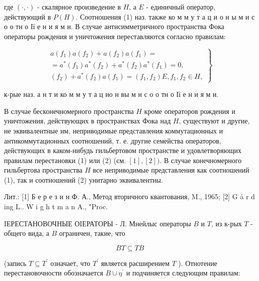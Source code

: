 \documentclass[10pt]{article}
\begin{document}
где $(\cdot, \cdot)$ - скалярное произведение в $H$, а $E$ - единичный оператор, действующий в $P(H)$. Соотношения (1) наз. также ко м м у т а ц и о н ы м и с о о тн о Ії е н и я м и. В случае антисимметричного пространства Фока операторы рождения и уничтожения переставляются согласно правилам:



\[

\left.\begin{array}{c}

a\left(f_{1}\right) a\left(f_{2}\right)+a\left(f_{2}\right) a\left(f_{1}\right)= \\

=a^{*}\left(f_{1}\right) a^{*}\left(f_{2}\right)+a^{*}\left(f_{2}\right) a^{*}\left(f_{1}\right)=0, \\

\left(f_{2}\right)+a^{*}\left(f_{2}\right) a\left(f_{1}\right)=\left(f_{1}, f_{2}\right) E, f_{1}, f_{2} \in H,

\end{array}\right\}

\]



к-рые наз. а н т и ко м м у т а ц ио н вы м и с о о тн о Ії е н и я м и.



В случае бесконечномерного пространства $H$ кроме операторов рождения и уничтожения, действующих в пространствах Фока над $H$, существуют и другие, не эквивалентные им, неприводимые представления коммутационных и антикоммутационных соотношений, т. е. другие семейства операторов, действующих в каком-нибудь гильбертовом пространстве и удовлетворяющих правилам перестановки (1) или (2) (см. $[1],[2])$. В случае конечномерного гильбертова пространства $H$ все неприводимые представления как соотношений (1), так и соотношений (2) унитарно эквивалентны.



Лит.: [1] Б е р е з и н Ф. А., Метод вторичного квантования, M., 1965; [2] G å r d ing L.. W i g h t m a n A., "Proc.



IЕРЕСТАНОВОЧНЫЕ ОIЕРАТОРЫ - Л. Мнейлыс операторы $B$ и $T$, из к-рых $T$ - общего вида, а $B$ ограничен, такие, что



\[

B T \subseteq T B

\]



(запись $T \subseteq T^{\prime}$ означает, что $T^{\prime}$ является расширением $T$ ). Отнотение перестановочности обозначается $B \cup \eta^{\prime}$ и подчиняется следующим правилам:
\end{document}
